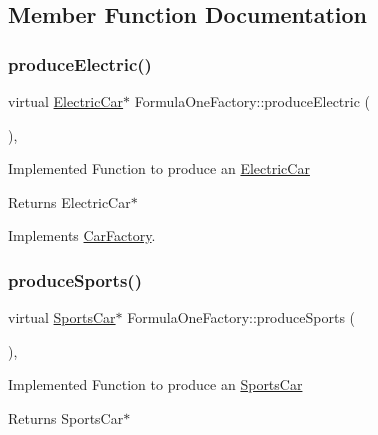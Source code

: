 \subsection{Member Function Documentation}
\mbox{\label{class_formula_one_factory_a84f67420468555a786c8103e21deeaf8}} 
\subsubsection{\texorpdfstring{produce\+Electric()}{produceElectric()}}
{\footnotesize\ttfamily virtual \mbox{\hyperlink{class_electric_car}{Electric\+Car}}$\ast$ Formula\+One\+Factory\+::produce\+Electric (\begin{DoxyParamCaption}{ }\end{DoxyParamCaption})\hspace{0.3cm}{\ttfamily [inline]}, {\ttfamily [virtual]}}

Implemented Function to produce an \mbox{\hyperlink{class_electric_car}{Electric\+Car}} \begin{DoxyReturn}{Returns}
Electric\+Car$\ast$ 
\end{DoxyReturn}


Implements \mbox{\hyperlink{class_car_factory_a2a9be1558ef604f44ea3588bcc06b3db}{Car\+Factory}}.

\mbox{\label{class_formula_one_factory_a33707e14c22e124b204f268cca3ad21a}} 
\subsubsection{\texorpdfstring{produce\+Sports()}{produceSports()}}
{\footnotesize\ttfamily virtual \mbox{\hyperlink{class_sports_car}{Sports\+Car}}$\ast$ Formula\+One\+Factory\+::produce\+Sports (\begin{DoxyParamCaption}{ }\end{DoxyParamCaption})\hspace{0.3cm}{\ttfamily [inline]}, {\ttfamily [virtual]}}

Implemented Function to produce an \mbox{\hyperlink{class_sports_car}{Sports\+Car}} \begin{DoxyReturn}{Returns}
Sports\+Car$\ast$ 
\end{DoxyReturn}


